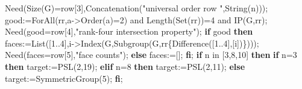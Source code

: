 \documentclass[
  11pt,
  a4paper,
]{article}
\newenvironment{Shaded}{}{}
\newcommand{\BuiltInTok}[1]{\textcolor[rgb]{0.00,0.50,0.00}{#1}}
\newcommand{\ConstantTok}[1]{\textcolor[rgb]{0.53,0.00,0.00}{#1}}
\newcommand{\ControlFlowTok}[1]{\textcolor[rgb]{0.00,0.44,0.13}{\textbf{#1}}}
\newcommand{\ExtensionTok}[1]{#1}
\newcommand{\FloatTok}[1]{\textcolor[rgb]{0.25,0.63,0.44}{#1}}
\newcommand{\NormalTok}[1]{#1}
\newcommand{\OperatorTok}[1]{\textcolor[rgb]{0.40,0.40,0.40}{#1}}
\newcommand{\StringTok}[1]{\textcolor[rgb]{0.25,0.44,0.63}{#1}}
\newcommand{\VariableTok}[1]{\textcolor[rgb]{0.10,0.09,0.49}{#1}}
\begin{document}
\begin{Shaded}
\begin{Highlighting}[]
  \VariableTok{Need}\NormalTok{(}\BuiltInTok{Size}\NormalTok{(}\VariableTok{G}\NormalTok{)}\OperatorTok{=}\VariableTok{row}\NormalTok{[}\FloatTok{3}\NormalTok{]}\OperatorTok{,}\BuiltInTok{Concatenation}\NormalTok{(}\StringTok{"universal order row "}\OperatorTok{,}\BuiltInTok{String}\NormalTok{(}\VariableTok{n}\NormalTok{)))}\OperatorTok{;}
  \VariableTok{good}\OperatorTok{:=}\BuiltInTok{ForAll}\NormalTok{(}\VariableTok{rr}\OperatorTok{,}\VariableTok{a}\OperatorTok{{-}\textgreater{}}\BuiltInTok{Order}\NormalTok{(}\VariableTok{a}\NormalTok{)}\OperatorTok{=}\FloatTok{2}\NormalTok{) }\ConstantTok{and} \BuiltInTok{Length}\NormalTok{(}\BuiltInTok{Set}\NormalTok{(}\VariableTok{rr}\NormalTok{))}\OperatorTok{=}\FloatTok{4} \ConstantTok{and} \VariableTok{IP}\NormalTok{(}\VariableTok{G}\OperatorTok{,}\VariableTok{rr}\NormalTok{)}\OperatorTok{;}
  \VariableTok{Need}\NormalTok{(}\VariableTok{good}\OperatorTok{=}\VariableTok{row}\NormalTok{[}\FloatTok{4}\NormalTok{]}\OperatorTok{,}\StringTok{"rank{-}four intersection property"}\NormalTok{)}\OperatorTok{;}
  \ControlFlowTok{if} \VariableTok{good} \ControlFlowTok{then}
    \VariableTok{faces}\OperatorTok{:=}\BuiltInTok{List}\NormalTok{([}\FloatTok{1}\OperatorTok{..}\FloatTok{4}\NormalTok{]}\OperatorTok{,}\VariableTok{i}\OperatorTok{{-}\textgreater{}}\BuiltInTok{Index}\NormalTok{(}\VariableTok{G}\OperatorTok{,}\BuiltInTok{Subgroup}\NormalTok{(}\VariableTok{G}\OperatorTok{,}\VariableTok{rr}\NormalTok{\{}\BuiltInTok{Difference}\NormalTok{([}\FloatTok{1}\OperatorTok{..}\FloatTok{4}\NormalTok{]}\OperatorTok{,}\NormalTok{[}\VariableTok{i}\NormalTok{])\})))}\OperatorTok{;}
    \VariableTok{Need}\NormalTok{(}\VariableTok{faces}\OperatorTok{=}\VariableTok{row}\NormalTok{[}\FloatTok{5}\NormalTok{]}\OperatorTok{,}\StringTok{"face counts"}\NormalTok{)}\OperatorTok{;}
  \ControlFlowTok{else} \VariableTok{faces}\OperatorTok{:=}\NormalTok{[]}\OperatorTok{;} \ControlFlowTok{fi}\OperatorTok{;}
  \ControlFlowTok{if} \VariableTok{n} \ExtensionTok{in}\NormalTok{ [}\FloatTok{3}\OperatorTok{,}\FloatTok{8}\OperatorTok{,}\FloatTok{10}\NormalTok{] }\ControlFlowTok{then}
    \ControlFlowTok{if} \VariableTok{n}\OperatorTok{=}\FloatTok{3} \ControlFlowTok{then} \VariableTok{target}\OperatorTok{:=}\VariableTok{PSL}\NormalTok{(}\FloatTok{2}\OperatorTok{,}\FloatTok{19}\NormalTok{)}\OperatorTok{;} \ControlFlowTok{elif} \VariableTok{n}\OperatorTok{=}\FloatTok{8} \ControlFlowTok{then} \VariableTok{target}\OperatorTok{:=}\VariableTok{PSL}\NormalTok{(}\FloatTok{2}\OperatorTok{,}\FloatTok{11}\NormalTok{)}\OperatorTok{;} \ControlFlowTok{else} \VariableTok{target}\OperatorTok{:=}\BuiltInTok{SymmetricGroup}\NormalTok{(}\FloatTok{5}\NormalTok{)}\OperatorTok{;} \ControlFlowTok{fi}\OperatorTok{;}

\end{Highlighting}
\end{Shaded}
\end{document}
